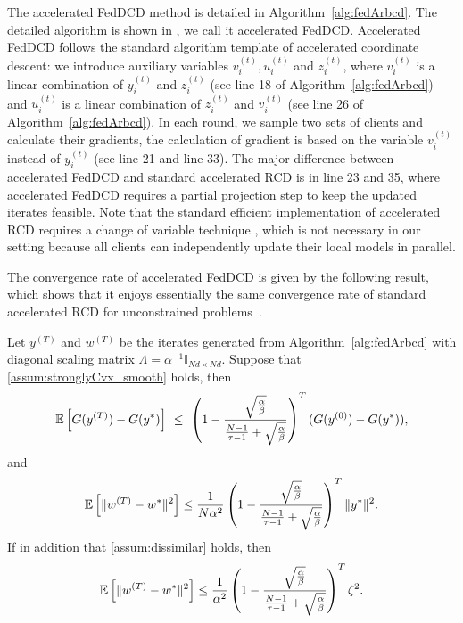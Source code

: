 The accelerated FedDCD method is detailed in Algorithm~\ref{alg:fedArbcd}. 
The detailed algorithm is shown in , we call it accelerated FedDCD. Accelerated FedDCD follows the standard algorithm template of accelerated coordinate descent: we introduce auxiliary variables $v_i^{(t)}, u_i^{(t)}$ and $z_i^{(t)}$, where $v_i^{(t)}$ is a linear combination of $y_i^{(t)}$ and $z_i^{(t)}$ (see line 18 of Algorithm~\ref{alg:fedArbcd}) and $u_i^{(t)}$ is a linear combination of $z_i^{(t)}$ and $v_i^{(t)}$ (see line 26 of Algorithm~\ref{alg:fedArbcd}). In each round, we sample two sets of clients and calculate their gradients, the calculation of gradient is based on the variable $v_i^{(t)}$ instead of $y_i^{(t)}$ (see line 21 and line 33).
The major difference between accelerated FedDCD and standard accelerated RCD is in line 23 and 35, where accelerated FedDCD requires a partial projection step to keep the updated iterates feasible.
Note that the standard efficient implementation of accelerated RCD requires a  change of variable technique \citep{LeeS13}, which is not necessary in our setting because all clients can independently update their local models in parallel.

The convergence rate of accelerated FedDCD is given by the following result, which shows that it enjoys essentially the same convergence rate of standard accelerated RCD for unconstrained problems~\citep{LeeS13,Lu18}.

\begin{theorem} \label{thm:accFedDCDStronglyCVX}
    Let $y^{(T)}$ and $w^{(T)}$ be the iterates generated from Algorithm~\ref{alg:fedArbcd} with diagonal scaling matrix $\Lambda = \alpha^{-1} \mathbb{I}_{Nd \times Nd}$. Suppose that \autoref{assum:stronglyCvx_smooth} holds, then
   \begin{equation} \label{eq:necoaraDualConvergenceStrongCVXAcc}
       \mathbb{E} \left[ G( y^{(T)} ) - G( y^* ) \right] ~\leq~ \left( 1 - \frac{ \sqrt{\frac{\alpha}{\beta}} }{ \frac{N-1}{\tau -1}+ \sqrt{\frac{\alpha}{\beta}} } \right)^{T} ( G(y^{(0)}) - G(y^*) ),
   \end{equation}
   and
   \begin{equation} \label{eq:necoaraPrimalConvergenceStrongCVXAcc}
       \mathbb{E} \left[ \| w^{(T)} - w^* \|^2 \right] 
       \leq \frac{1}{N\alpha^2} \left( 1 - \frac{ \sqrt{\frac{\alpha}{\beta}} }{ \frac{N-1}{\tau -1}+ \sqrt{\frac{\alpha}{\beta}} } \right)^{T} \|y^*\|^2.
   \end{equation}
   If in addition that \autoref{assum:dissimilar} holds, then
   \begin{equation} \label{eq:necoaraPrimalConvergenceDissimilarAcc}
       \mathbb{E} \left[ \| w^{(T)} - w^* \|^2 \right] 
       \leq \frac{1}{\alpha^2} \left( 1 - \frac{ \sqrt{\frac{\alpha}{\beta}} }{ \frac{N-1}{\tau -1}+ \sqrt{\frac{\alpha}{\beta}} } \right)^{T} \zeta^2. 
   \end{equation}
\end{theorem}


